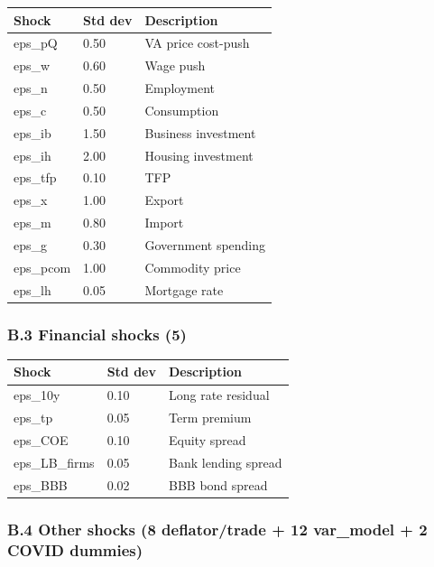 \documentclass[
]{article}
\newcounter{none} %
\begin{document}
{\def\LTcaptype{none} %
\begin{longtable}[]{@{}lll@{}}
\toprule\noalign{}
Shock & Std dev & Description \\
\midrule\noalign{}
\endhead
\bottomrule\noalign{}
\endlastfoot
eps\_pQ & 0.50 & VA price cost-push \\
eps\_w & 0.60 & Wage push \\
eps\_n & 0.50 & Employment \\
eps\_c & 0.50 & Consumption \\
eps\_ib & 1.50 & Business investment \\
eps\_ih & 2.00 & Housing investment \\
eps\_tfp & 0.10 & TFP \\
eps\_x & 1.00 & Export \\
eps\_m & 0.80 & Import \\
eps\_g & 0.30 & Government spending \\
eps\_pcom & 1.00 & Commodity price \\
eps\_lh & 0.05 & Mortgage rate \\
\end{longtable}
}

\subsubsection{B.3 Financial shocks (5)}\label{b.3-financial-shocks-5}

{\def\LTcaptype{none} %
\begin{longtable}[]{@{}lll@{}}
\toprule\noalign{}
Shock & Std dev & Description \\
\midrule\noalign{}
\endhead
\bottomrule\noalign{}
\endlastfoot
eps\_10y & 0.10 & Long rate residual \\
eps\_tp & 0.05 & Term premium \\
eps\_COE & 0.10 & Equity spread \\
eps\_LB\_firms & 0.05 & Bank lending spread \\
eps\_BBB & 0.02 & BBB bond spread \\
\end{longtable}
}

\subsubsection{B.4 Other shocks (8 deflator/trade + 12 var\_model + 2
COVID
dummies)}\label{b.4-other-shocks-8-deflatortrade-12-var_model-2-covid-dummies}
\end{document}
